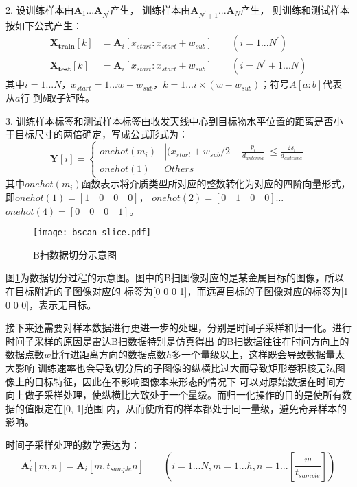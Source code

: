 2. 设训练样本由$\mathbf{A}_1$...$\mathbf{A}_{N^{\prime}}$产生，
训练样本由$\mathbf{A}_{N^{\prime} + 1}$...$\mathbf{A}_{N}$产生，
则训练和测试样本按如下公式产生：
\begin{equation}
	\begin{aligned}
	\mathbf{X_{train}}[k] &= \mathbf{A}_i[x_{start}:x_{start} + w_{sub}]\qquad (i = 1...N^{\prime})\\
	\mathbf{X_{test}}[k] &= \mathbf{A}_i[x_{start}:x_{start} + w_{sub}]\qquad (i = N^{\prime} + 1...N)
	\end{aligned}
\end{equation}
其中$i = 1...N$，$x_{start} = 1...w - w_{sub}$，$k = 1 ... i \times (w-w_{sub})$；符号$A[a:b]$代表从$a$行
到$b$取子矩阵。

3. 训练样本标签和测试样本标签由收发天线中心到目标物水平位置的距离是否小于目标尺寸的两倍确定，写成公式形式为：
$$
\mathbf{Y}[i] = 
	\begin{cases} 
		onehot(m_i) & |(x_{start} + w_{sub} / 2 - \frac{p_i}{d_{antenna}}| \leq \frac{2 s_i}{d_{antenna}} \\
		onehot(1)   & Others
	\end{cases}
$$
其中$onehot(m_i)$函数表示将介质类型所对应的整数转化为对应的四阶向量形式，即$onehot(1)=[1\quad 0 \quad 0 \quad 0]$，
$onehot(2)=[0\quad 1 \quad 0 \quad 0]$...$onehot(4)=[0\quad 0 \quad 0 \quad 1]$。
\begin{figure}[htbp]
	\texttt{[image: bscan\_slice.pdf]}
	\caption[]{B扫数据切分示意图}
	\label{bscan_slice}
\end{figure}

图\ref{bscan_slice}为数据切分过程的示意图。图中的B扫图像对应的是某金属目标的图像，所以在目标附近的子图像对应的
标签为[0 0 0 1]，而远离目标的子图像对应的标签为[1 0 0 0]，表示无目标。

接下来还需要对样本数据进行更进一步的处理，分别是时间子采样和归一化。进行时间子采样的原因是雷达B扫数据特别是仿真得出
的B扫数据往往在时间方向上的数据点数$w$比行进距离方向的数据点数$h$多一个量级以上，这样既会导致数据量太大影响
训练速率也会导致切分后的子图像的纵横比过大而导致矩形卷积核无法图像上的目标特征，因此在不影响图像本来形态的情况下
可以对原始数据在时间方向上做子采样处理，使纵横比大致处于一个量级。而归一化操作的目的是使所有数据的值限定在[0, 1]范围
内，从而使所有的样本都处于同一量级，避免奇异样本的影响。

时间子采样处理的数学表达为：
\begin{equation}
	\mathbf{A}^{\prime}_i[m, n] = \mathbf{A}_i[m, t_{sample} n] \qquad
	 (i = 1...N, m = 1...h, n = 1...[\frac{w}{t_{sample}}]) 
\end{equation}

